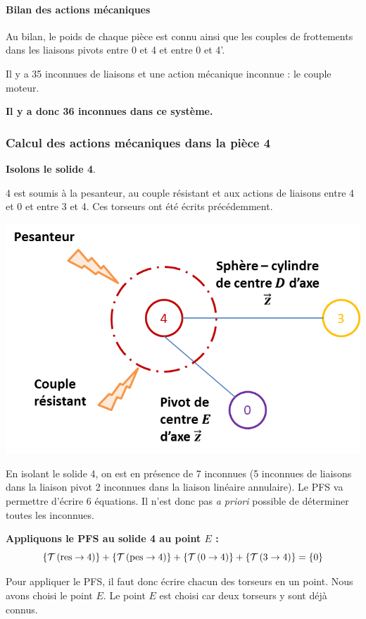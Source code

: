 \documentclass[10pt]{article}
\begin{document}
\paragraph*{Bilan des actions mécaniques}
Au bilan, le poids de chaque pièce est connu ainsi que les couples de frottements dans les liaisons pivots entre 0 et 4 et entre 0 et 4'. 

Il y a 35 inconnues de liaisons et une action mécanique inconnue : le couple moteur. 

\textbf{Il y a donc 36 inconnues dans ce système.}

\subsubsection{Calcul des actions mécaniques dans la pièce 4}

\textbf{Isolons le solide 4}. 

4 est soumis à la pesanteur, au couple résistant et aux actions de liaisons entre 4 et 0 et entre 3 et 4. Ces torseurs ont été écrits précédemment.

\begin{center}
\includegraphics[width=.6\textwidth]{images/4}
\end{center}

\begin{rem}
En isolant le solide 4, on est en présence de 7 inconnues (5 inconnues de liaisons dans la liaison pivot 2 inconnues dans la liaison linéaire annulaire). Le PFS va permettre d'écrire 6 équations. Il n'est donc pas \textit{a priori} possible de déterminer toutes les inconnues.
\end{rem}

\textbf{Appliquons le PFS au solide 4 au point $E$ :}
$$
\left\{\mathcal{T} \left(\text{res}\rightarrow 4 \right) \right\} 
+ \left\{\mathcal{T} \left(\text{pes}\rightarrow 4 \right) \right\}
+ \left\{\mathcal{T} \left(0\rightarrow 4 \right) \right\}
+ \left\{\mathcal{T} \left(3\rightarrow 4 \right) \right\}
=\left\{ 0\right\}
$$

Pour appliquer le PFS, il faut donc écrire chacun des torseurs en un point. Nous avons choisi le point $E$. Le point $E$ est choisi car deux torseurs y sont déjà connus.
\end{document}
